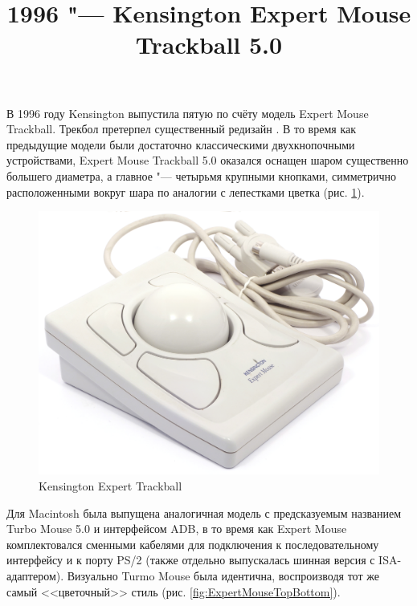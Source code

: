 \documentclass[11pt, a4paper]{article}
\begin{document}
\title{1996 "--- Kensington Expert Mouse Trackball 5.0}
\date{}
\maketitle

В 1996 году Kensington выпустила пятую по счёту модель Expert Mouse Trackball. Трекбол претерпел существенный редизайн \cite{KensingtonPC}. В то время как предыдущие модели были достаточно классическими двухкнопочными устройствами, Expert Mouse Trackball 5.0 оказался оснащен шаром существенно большего диаметра, а главное "---  четырьмя крупными кнопками, симметрично расположенными вокруг шара по аналогии с лепестками цветка (рис. \ref{fig:ExpertMousePic}).

\begin{figure}[h]
    \centering
    \includegraphics[scale=0.4]{1996_kensington_expert_trackball_5/pic_60.jpg}
    \caption{Kensington Expert Trackball}
    \label{fig:ExpertMousePic}
\end{figure}

Для Macintosh была выпущена аналогичная модель с предсказуемым названием Turbo Mouse 5.0 \cite{KensingtonMac} и интерфейсом ADB, в то время как Expert Mouse комплектовался сменными кабелями для подключения к последовательному интерфейсу и к порту PS/2 (также отдельно выпускалась шинная версия с ISA-адаптером). Визуально Turmo Mouse была идентична, воспроизводя тот же самый <<цветочный>> стиль (рис. \ref{fig:ExpertMouseTopBottom}).
\end{document}
